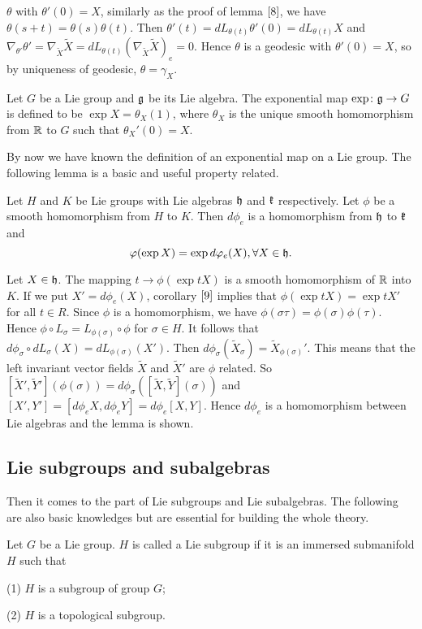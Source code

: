 $\theta$ with $\theta'(0)=X$, similarly as the proof of lemma
$\ref{8}$, we have $\theta(s+t)=\theta(s)\theta(t)$. Then
$\theta'(t)=dL_{\theta(t)}\theta'(0)=dL_{\theta(t)}X$ and
$\nabla_{\theta'}\theta'=\nabla_{\tilde X}\tilde
X=dL_{\theta(t)}(\nabla_{\tilde X}\tilde X)_e=0$. Hence $\theta$
is a geodesic with $\theta'(0)=X$, so by uniqueness of geodesic,
$\theta=\gamma_X$.
\eproof
\begin{definition}
	Let $G$ be a Lie group and ${\mathfrak g}$ be its Lie algebra. The
	exponential map $\exp\colon{\mathfrak g}\to G$ is defined to be $\exp X =
	\theta_X(1)$, where $\theta_X$ is the unique smooth
	homomorphism from ${\mathbb R}$ to $G$ such that $\theta_X'(0) = X$.
\end{definition}

By now we have known the definition of an exponential map on a
Lie group. The following lemma is a basic and useful property
related.

\begin{lemma}
	Let $H$ and $K$ be Lie groups with Lie algebras ${\mathfrak h}$ and
	${\mathfrak k}$ respectively. Let $\phi$ be a smooth homomorphism from
	$H$ to $K$. Then $d\phi_e$ is a homomorphism from ${\mathfrak h}$ to
	${\mathfrak k}$ and
	\[\varphi(\exp X)=\exp d\varphi_e(X), \forall X\in {\mathfrak h}.\]
\end{lemma}
\bproof
Let $X \in {\mathfrak h}$. The mapping $t \to \phi(\exp tX)$ is a smooth
homomorphism of ${\mathbb R}$ into $K$. If we put $X' = d\phi_e(X)$,
corollary $\ref{9}$ implies that $\phi(\exp tX) = \exp tX'$ for
all $t \in R$. Since $\phi $ is a homomorphism, we have
$\phi(\sigma\tau) = \phi(\sigma)\phi(\tau)$. Hence $\phi\circ
L_{\sigma}=L_{\phi(\sigma)}\circ\phi$ for $\sigma \in H$. It
follows that $d\phi_{\sigma}\circ
dL_{\sigma}(X)=dL_{\phi(\sigma)}(X')$. Then
$d\phi_{\sigma}(\tilde X_{\sigma})=\tilde X_{\phi(\sigma)}'$.
This means that the left invariant vector fields $\tilde{X}$ and
$\tilde X'$ are $\phi $ related. So $[\tilde X', \tilde
Y'](\phi(\sigma))=d\phi_{\sigma}([\tilde X, \tilde Y](\sigma))$
and $[X', Y']=[d\phi_eX, d\phi_eY]=d\phi_e[X, Y]$. Hence
$d\phi_e$ is a homomorphism between Lie algebras and the lemma is
shown.
\eproof
\subsection{Lie subgroups and subalgebras}

Then it comes to the part of Lie subgroups and Lie subalgebras.
The following are also basic knowledges but are essential for
building the whole theory.

\begin{definition}
	Let $G$ be a Lie group. $H$ is called a Lie subgroup if it is
	an immersed submanifold $H$ such that
	
	(1) $H$ is a subgroup of group $G$;
	
	(2) $H$ is a topological subgroup.
\end{definition}

